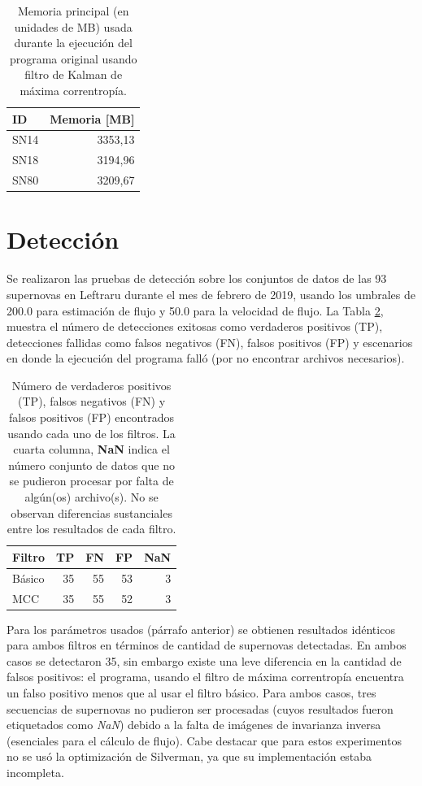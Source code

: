 \begin{table}[h!]
\centering
\caption{Memoria principal (en unidades de MB) usada durante la ejecuci\'on del programa original usando filtro de Kalman de m\'axima correntrop\'ia.}
\begin{tabular}{|l|r|}
\hline
\textbf{ID} & Memoria [MB]\\\hline\hline
SN14 & 3353,13\\\hline
SN18 & 3194,96\\\hline
SN80 & 3209,67\\\hline
\end{tabular}
\label{tab:mem2}
\end{table}

\section{Detecci\'on}
Se realizaron las pruebas de detecci\'on sobre los conjuntos de datos de las 93 supernovas en Leftraru durante el mes de febrero de 2019, usando los  umbrales de 200.0 para estimaci\'on de flujo y 50.0 para la velocidad de flujo. La Tabla \ref{tab:tpfn}, muestra el n\'umero de detecciones exitosas como verdaderos positivos (TP), detecciones fallidas como falsos negativos (FN), falsos positivos (FP) y escenarios en donde la ejecuci\'on del programa fall\'o (por no encontrar archivos necesarios). 
\bigskip

\begin{table}[h!]
\centering
\caption{N\'umero de verdaderos positivos (TP), falsos negativos (FN) y falsos positivos (FP) encontrados usando cada uno de los filtros. La cuarta columna, \textbf{NaN} indica el n\'umero conjunto de datos que no se pudieron procesar por falta de alg\'un(os) archivo(s). No se observan diferencias sustanciales entre los resultados de cada filtro.}
\begin{tabular}{|l|r|r|r|r|}
\hline
\textbf{Filtro} & \textbf{TP} & \textbf{FN} & \textbf{FP}  & \textbf{NaN}\\ \hline
Básico          & 35          & 55         & 53 & 3 \\ \hline
MCC             & 35          & 55         & 52 & 3 \\ \hline
\end{tabular}
\label{tab:tpfn}
\end{table}

Para los par\'ametros usados (p\'arrafo anterior) se obtienen resultados id\'enticos para ambos filtros en t\'erminos de cantidad de supernovas detectadas. En ambos casos se detectaron 35, sin embargo existe una leve diferencia en la cantidad de falsos positivos: el programa, usando el filtro de m\'axima correntrop\'ia encuentra un falso positivo menos que al usar el filtro b\'asico. Para ambos casos, tres secuencias de supernovas no pudieron ser procesadas (cuyos resultados fueron etiquetados como \textit{NaN}) debido a la falta de im\'agenes de invarianza inversa (esenciales para el c\'alculo de flujo). Cabe destacar que para estos experimentos no se us\'o la optimizaci\'on de Silverman, ya que su implementaci\'on estaba incompleta.  %
\bigskip

